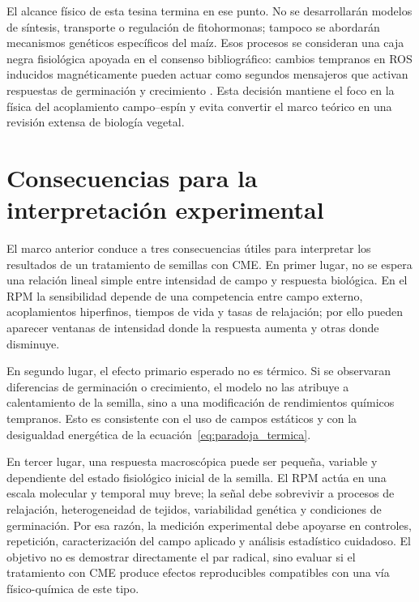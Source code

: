 El alcance físico de esta tesina termina en ese punto. No se desarrollarán modelos de síntesis, transporte o regulación de fitohormonas; tampoco se abordarán mecanismos genéticos específicos del maíz. Esos procesos se consideran una caja negra fisiológica apoyada en el consenso bibliográfico: cambios tempranos en ROS inducidos magnéticamente pueden actuar como segundos mensajeros que activan respuestas de germinación y crecimiento \cite{araujo_2016,sarraf_2020,shine_2017}. Esta decisión mantiene el foco en la física del acoplamiento campo--espín y evita convertir el marco teórico en una revisión extensa de biología vegetal.

\section{Consecuencias para la interpretación experimental}
\label{sec:consecuencias_rpm}

El marco anterior conduce a tres consecuencias útiles para interpretar los resultados de un tratamiento de semillas con CME. En primer lugar, no se espera una relación lineal simple entre intensidad de campo y respuesta biológica. En el RPM la sensibilidad depende de una competencia entre campo externo, acoplamientos hiperfinos, tiempos de vida y tasas de relajación; por ello pueden aparecer ventanas de intensidad donde la respuesta aumenta y otras donde disminuye.

En segundo lugar, el efecto primario esperado no es térmico. Si se observaran diferencias de germinación o crecimiento, el modelo no las atribuye a calentamiento de la semilla, sino a una modificación de rendimientos químicos tempranos. Esto es consistente con el uso de campos estáticos y con la desigualdad energética de la ecuación~\eqref{eq:paradoja_termica}.

En tercer lugar, una respuesta macroscópica puede ser pequeña, variable y dependiente del estado fisiológico inicial de la semilla. El RPM actúa en una escala molecular y temporal muy breve; la señal debe sobrevivir a procesos de relajación, heterogeneidad de tejidos, variabilidad genética y condiciones de germinación. Por esa razón, la medición experimental debe apoyarse en controles, repetición, caracterización del campo aplicado y análisis estadístico cuidadoso. El objetivo no es demostrar directamente el par radical, sino evaluar si el tratamiento con CME produce efectos reproducibles compatibles con una vía físico-química de este tipo.



\endinput
